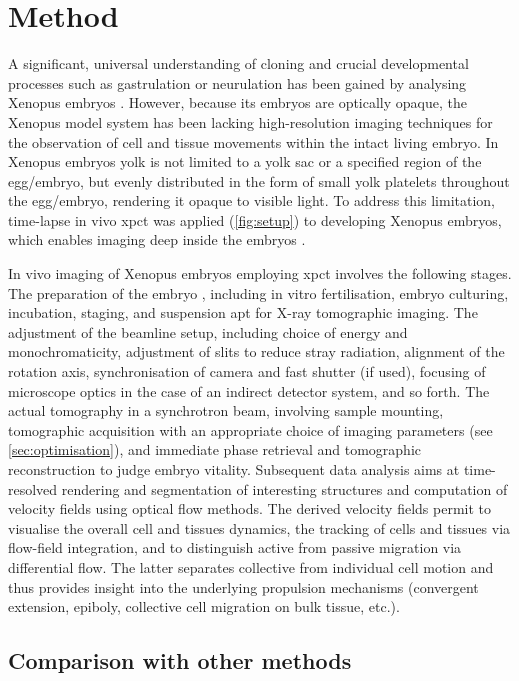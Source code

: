 \documentclass[
twoside,
openright,
titlepage,
numbers=noenddot,
headinclude,
fleqn,
a4paper,
footinclude=true,
cleardoublepage=empty,
abstractoff,
BCOR=5mm,
paper=a4,
fontsize=11pt,
british,ngerman,american,
]{scrreprt}
\begin{document}
\section{Method}
\label{sec:method-optimisation}

A significant, universal understanding of cloning and crucial
developmental processes such as gastrulation or neurulation has been
gained by analysing Xenopus embryos
\cite{Gurdon1962a,Gurdon1962b,Keller2003}.  However, because its
embryos are optically opaque, the Xenopus model system has been
lacking high-resolution imaging techniques for the observation of cell
and tissue movements within the intact living embryo.  In Xenopus
embryos yolk is not limited to a yolk sac or a specified region of the
egg/embryo, but evenly distributed in the form of small yolk platelets
throughout the egg/embryo, rendering it opaque to visible light.  To
address this limitation, time-lapse in vivo \ac{xpct} was applied
(\cref{fig:setup}) to developing Xenopus embryos, which enables
imaging deep inside the embryos \cite{Moosmann2013nature}.

In vivo imaging of Xenopus embryos employing \ac{xpct} involves the
following stages.  The preparation of the embryo \cite{Kashef2009},
including in vitro fertilisation, embryo culturing, incubation,
staging, and suspension apt for X-ray tomographic imaging.  The
adjustment of the beamline setup, including choice of energy and
monochromaticity, adjustment of slits to reduce stray radiation,
alignment of the rotation axis, synchronisation of camera and fast
shutter (if used), focusing of microscope optics in the case of an
indirect detector system, and so forth.  The actual tomography in a
synchrotron beam, involving sample mounting, tomographic acquisition
with an appropriate choice of imaging parameters (see
\cref{sec:optimisation}), and immediate phase retrieval and
tomographic reconstruction to judge embryo vitality.  Subsequent data
analysis aims at time-resolved rendering and segmentation of
interesting structures and computation of velocity fields using
optical flow methods.  The derived velocity fields permit to visualise
the overall cell and tissues dynamics, the tracking of cells and
tissues via flow-field integration, and to distinguish active from
passive migration  via differential flow.  The latter
separates collective from  individual cell motion and thus
provides insight into the underlying propulsion mechanisms (convergent
extension, epiboly, collective cell migration on bulk tissue, etc.).


\subsection{Comparison with other methods}
\label{sec:comparison}
\end{document}
